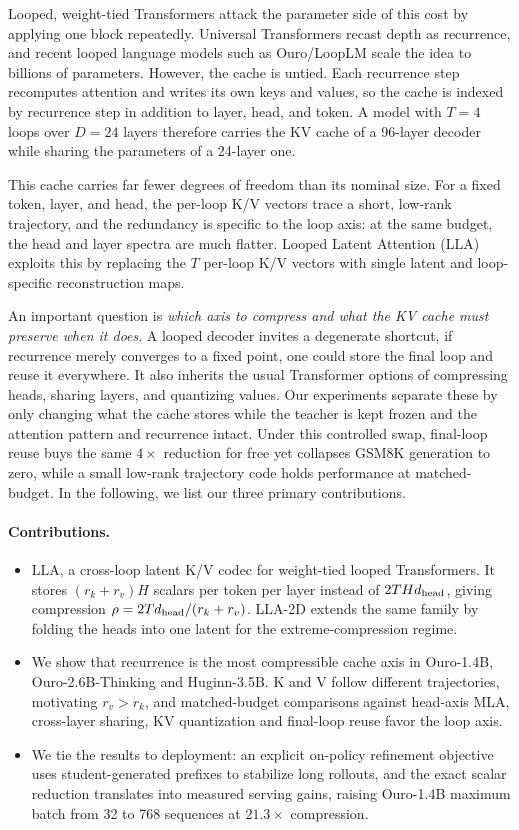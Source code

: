 \documentclass[10pt]{article}
\newcommand{\lla}{LLA}
\begin{document}
Looped, weight-tied Transformers attack the parameter side of this cost by applying one block repeatedly. Universal Transformers \citep{dehghani2019universal} recast depth as recurrence, and recent looped language models such as Ouro/LoopLM \citep{ouro2024} scale the idea to billions of parameters. However, the cache is untied. Each recurrence step recomputes attention and writes its own keys and values, so the cache is indexed by recurrence step in addition to layer, head, and token. A model with $T=4$ loops over $D=24$ layers therefore carries the KV cache of a 96-layer decoder while sharing the parameters of a 24-layer one.

This cache carries far fewer degrees of freedom than its nominal size. For a fixed token, layer, and head, the per-loop K/V vectors trace a short, low-rank trajectory, and the redundancy is specific to the loop axis: at the same budget, the head and layer spectra are much flatter. Looped Latent Attention (\lla{}) exploits this by replacing the $T$ per-loop K/V vectors with single latent and loop-specific reconstruction maps.

An important question is \textit{which axis to compress and what the KV cache must preserve when it does}. A looped decoder invites a degenerate shortcut, if recurrence merely converges to a fixed point, one could store the final loop and reuse it everywhere. It also inherits the usual Transformer options of compressing heads, sharing layers, and quantizing values. Our experiments separate these by only changing what the cache stores while the teacher is kept frozen and the attention pattern and recurrence intact. Under this controlled swap, final-loop reuse buys the same $4\times$ reduction for free yet collapses GSM8K generation to zero, while a small low-rank trajectory code holds performance at matched-budget. In the following, we list our three primary contributions.

\paragraph{Contributions.}
\begin{itemize}
  \item \lla{}, a cross-loop latent K/V codec for weight-tied looped Transformers. It stores $(r_k+r_v)H$ scalars per token per layer instead of $2THd_{\rm head}$, giving compression $\rho=2Td_{\rm head}/(r_k+r_v)$. \lla{}-2D extends the same family by folding the heads into one latent for the extreme-compression regime.
  \item We show that recurrence is the most compressible cache axis in Ouro-1.4B, Ouro-2.6B-Thinking and Huginn-3.5B. K and V follow different trajectories, motivating $r_v>r_k$, and matched-budget comparisons against head-axis MLA, cross-layer sharing, KV quantization and final-loop reuse favor the loop axis.
  \item We tie the results to deployment: an explicit on-policy refinement objective uses student-generated prefixes to stabilize long rollouts, and the exact scalar reduction translates into measured serving gains, raising Ouro-1.4B maximum batch from 32 to 768 sequences at $21.3\times$ compression.
\end{itemize}
\end{document}

